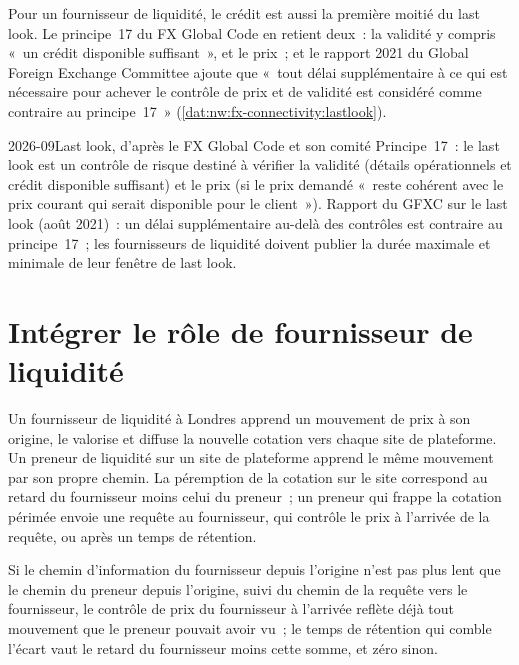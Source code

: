 Pour un fournisseur de liquidité, le crédit est aussi la première moitié du last look. Le principe~17 du FX Global Code en retient deux~: la validité
y compris «~un crédit disponible suffisant~», et le prix~; et le rapport 2021 du Global Foreign Exchange Committee ajoute que «~tout délai
supplémentaire à ce qui est nécessaire pour achever le contrôle de prix et de validité est considéré comme contraire au principe~17~»
(\cref{dat:nw:fx-connectivity:lastlook}).

\begin{dated}{2026-09}{Last look, d'après le FX Global Code et son comité}\label{dat:nw:fx-connectivity:lastlook}
Principe~17~: le last look est un contrôle de risque destiné à vérifier la validité (détails opérationnels et crédit disponible suffisant) et le prix (si le prix demandé
«~reste cohérent avec le prix courant qui serait disponible pour le client~»). Rapport du GFXC sur le last look
(août 2021)~: un délai supplémentaire au-delà des contrôles est contraire au principe~17~; les fournisseurs de liquidité doivent publier la
durée maximale et minimale de leur fenêtre de last look.
\end{dated}

\section{Intégrer le rôle de fournisseur de liquidité}

Un fournisseur de liquidité à Londres apprend un mouvement de prix à son origine, le valorise et diffuse la nouvelle cotation vers chaque site de plateforme. Un preneur
de liquidité sur un site de plateforme apprend le même mouvement par son propre chemin. La péremption de la cotation sur le site correspond au retard du fournisseur moins celui du preneur~;
un preneur qui frappe la cotation périmée envoie une requête au fournisseur, qui contrôle le prix à l'arrivée de la requête,
ou après un temps de rétention.

\label{lst:nw:fx-connectivity:stale}

\begin{proposition}\label{prop:nw:fx-connectivity:hold}
Si le chemin d'information du fournisseur depuis l'origine n'est pas plus lent que le chemin du preneur depuis l'origine, suivi du chemin de la requête
vers le fournisseur, le contrôle de prix du fournisseur à l'arrivée reflète déjà tout mouvement que le preneur pouvait avoir vu~; le temps de rétention qui comble l'écart
vaut le retard du fournisseur moins cette somme, et zéro sinon.
\end{proposition}

